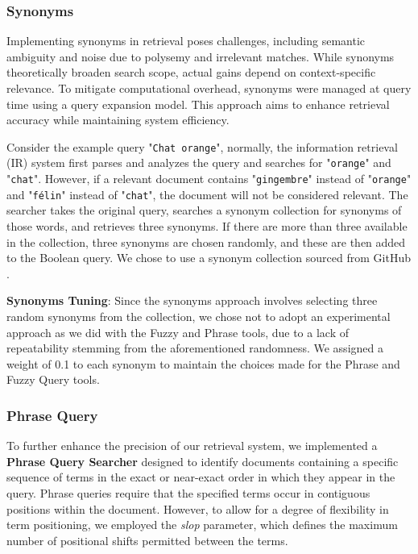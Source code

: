 \subsubsection{Synonyms}
\label{subsubsec:synonyms}
Implementing synonyms in retrieval poses challenges, including semantic ambiguity and noise due to polysemy and irrelevant matches. While synonyms theoretically broaden search scope, actual gains depend on context-specific relevance. To mitigate computational overhead, synonyms were managed at query time using a query expansion model. This approach aims to enhance retrieval accuracy while maintaining system efficiency.

Consider the example query "\texttt{Chat orange}", normally, the information retrieval (IR) system first parses and analyzes the query and searches for "\texttt{orange}" and "\texttt{chat}". However, if a relevant document contains "\texttt{gingembre}" instead of "\texttt{orange}" and "\texttt{félin}" instead of "\texttt{chat}", the document will not be considered relevant. The searcher takes the original query, searches a synonym collection for synonyms of those words, and retrieves three synonyms. If there are more than three available in the collection, three synonyms are chosen randomly, and these are then added to the Boolean query. We chose to use a synonym collection sourced from GitHub \cite{lorenzon2016vim}. 

\textbf{Synonyms Tuning}: Since the synonyms approach involves selecting three random synonyms from the collection, we chose not to adopt an experimental approach as we did with the Fuzzy and Phrase tools, due to a lack of repeatability stemming from the aforementioned randomness. We assigned a weight of 0.1 to each synonym to maintain the choices made for the Phrase and Fuzzy Query tools.

\subsubsection{Phrase Query}
\label{subsubsec: Phrase Query }

To further enhance the precision of our retrieval system, we implemented a \textbf{Phrase Query Searcher} designed to identify documents containing a specific sequence of terms in the exact or near-exact order in which they appear in the query. Phrase queries require that the specified terms occur in contiguous positions within the document. However, to allow for a degree of flexibility in term positioning, we employed the \textit{slop} parameter, which defines the maximum number of positional shifts permitted between the terms.

